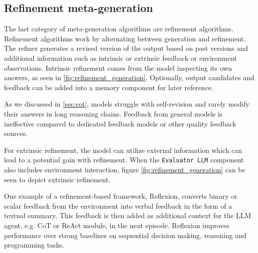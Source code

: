\subsection{Refinement meta-generation} \label{sec:refine}
The last category of meta-generation algorithms are refinement algorithms. Refinement algorithms work by alternating between generation and refinement.
The refiner generates a revised version of the output based on past versions and additional information such as intrinsic or extrinsic feedback or environment observations\cite{welleck2024decodingmetagenerationinferencetimealgorithms}. 
Intrinsic refinement comes from the model inspecting its own answers, as seen in \ref{fig:refinement_generation}. Optionally, output candidates and feedback can be added into a memory component for later reference.

As we discussed in \ref{sec:cot}, models struggle with self-revision and rarely modify their answers in long reasoning chains.
Feedback from general models is ineffective compared to dedicated feedback models or other quality feedback sources\cite{wang2025dedicatedfeedbackeditmodels}. 

For extrinsic refinement, the model can utilize external information which can lead to a potential gain with refinement\cite{welleck2024decodingmetagenerationinferencetimealgorithms}.
When the \texttt{Evaluator LLM} component also includes environment interaction, figure \ref{fig:refinement_generation} can be seen to depict extrinsic refinement.

One example of a refinement-based framework, Reflexion\cite{shinn2023reflexionlanguageagentsverbal}, converts binary or scalar feedback from the environment into verbal feedback in the form 
of a textual summary. This feedback is then added as additional context for the LLM agent, e.g. CoT or ReAct module, in the next episode. 
Reflexion improves performance over strong baselines on sequential decision making, reasoning and programming tasks\cite{shinn2023reflexionlanguageagentsverbal}.


